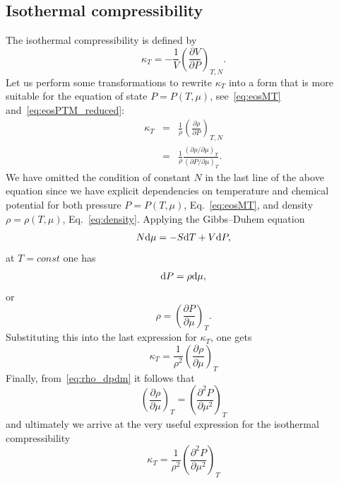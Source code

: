 \subsection{Isothermal compressibility}
The isothermal compressibility is defined by
\begin{equation}
	\label{def:isotherm_compres}
	\kappa_T = -\frac{1}{V}\left(\frac{\partial V}{\partial P}\right)_{T, N}.
\end{equation}
Let us perform some transformations to rewrite $\kappa_T$ into a form that is more suitable for the equation of state $P=P(T,\mu)$, see~\eqref{eq:eosMT} and~\eqref{eq:eosPTM_reduced}:
\begin{eqnarray*}
	\kappa_T	& = & \frac{1}{\rho} \left(\frac{\partial \rho}{\partial P} \right)_{T,N}
	\\
	& = & \frac{1}{\rho} \frac{\left(\partial \rho / \partial \mu\right)_{T}}
	{\left(\partial P / \partial \mu\right)_{T}}.
\end{eqnarray*}
We have omitted the condition of constant $N$ in the last line of the above equation since we have explicit dependencies on temperature and chemical potential for both pressure $P = P(T, \mu)$, Eq.~\eqref{eq:eosMT}, and density $\rho = \rho(T, \mu)$, Eq.~\eqref{eq:density}.
Applying the Gibbs--Duhem equation
\begin{equation}
	N{\rm d}\mu = -S{\rm d}T + V{\rm d}P,
\end{equation}
at $T = const$ one has 
\begin{equation*}
	{\rm d} P = \rho {\rm d} \mu,
\end{equation*}
or
\begin{equation}
	\label{eq:rho_dpdm}
	\rho = \left(\frac{\partial P}{\partial \mu}\right)_T.
\end{equation}
Substituting this into the last expression for $\kappa_T$, one gets
\begin{equation}
	\kappa_T = \frac{1}{\rho^2} \left(\frac{\partial \rho}{\partial \mu}\right)_{T}
\end{equation}
Finally, from~\eqref{eq:rho_dpdm} it follows that
\begin{equation}
	\left(\frac{\partial \rho}{\partial \mu}\right)_T = \left(\frac{\partial^2 P}{\partial \mu^2}\right)_T
\end{equation}
and ultimately we arrive at the very useful expression for the isothermal compressibility
\begin{equation}
	\kappa_T = \frac{1}{\rho^2} \left(\frac{\partial^2 P}{\partial \mu^2}\right)_{T}
\end{equation}

